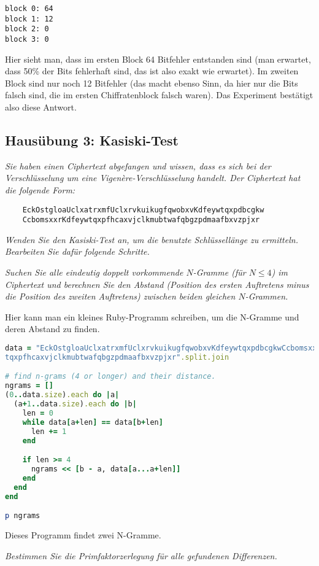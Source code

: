\documentclass[
  ngerman,
  DIV=12
]{scrartcl}
\begin{document}
\begin{lstlisting}
block 0: 64
block 1: 12
block 2: 0
block 3: 0  
\end{lstlisting}
Hier sieht man, dass im ersten Block 64 Bitfehler entstanden sind (man erwartet, dass 50\% der Bits fehlerhaft sind, das ist also exakt wie erwartet). Im zweiten Block sind nur noch 12 Bitfehler (das macht ebenso Sinn, da hier nur die Bits falsch sind, die im ersten Chiffratenblock falsch waren). Das Experiment bestätigt also diese Antwort.

\subsection*{Hausübung 3: Kasiski-Test}

\emph{Sie haben einen Ciphertext abgefangen und wissen, dass es sich bei der Verschlüsselung um eine Vigenère-Verschlüsselung handelt. Der Ciphertext hat die folgende Form:}
\begin{verbatim}
    EckOstgloaUclxatrxmfUclxrvkuikugfqwobxvKdfeywtqxpdbcgkw
    CcbomsxxrKdfeywtqxpfhcaxvjclkmubtwafqbgzpdmaafbxvzpjxr
\end{verbatim}
\emph{Wenden Sie den Kasiski-Test an, um die benutzte Schlüssellänge zu ermitteln. Bearbeiten Sie dafür folgende Schritte.}

\medskip\noindent
\emph{Suchen Sie alle eindeutig doppelt vorkommende $N$-Gramme (für $N \leq 4$) im Ciphertext und berechnen Sie den Abstand (Position des ersten Auftretens minus die Position des zweiten Auftretens) zwischen beiden gleichen $N$-Grammen.}

\medskip\noindent
Hier kann man ein kleines Ruby-Programm schreiben, um die N-Gramme und deren Abstand zu finden.
\begin{lstlisting}[language=ruby]
data = "EckOstgloaUclxatrxmfUclxrvkuikugfqwobxvKdfeywtqxpdbcgkwCcbomsxxrKdfeyw
tqxpfhcaxvjclkmubtwafqbgzpdmaafbxvzpjxr".split.join

# find n-grams (4 or longer) and their distance. 
ngrams = []
(0..data.size).each do |a|
  (a+1..data.size).each do |b|
    len = 0
    while data[a+len] == data[b+len]
      len += 1
    end

    if len >= 4
      ngrams << [b - a, data[a...a+len]]
    end
  end
end

p ngrams  
\end{lstlisting}
Dieses Programm findet zwei N-Gramme.

\bigskip\noindent
\emph{Bestimmen Sie die Primfaktorzerlegung für alle gefundenen Differenzen.}
\end{document}
